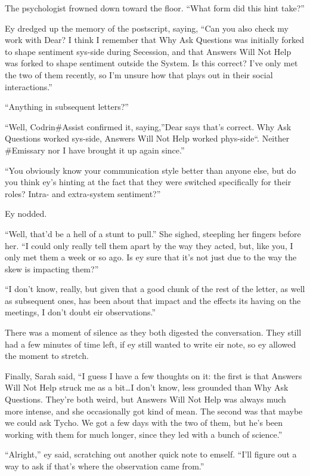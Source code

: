 The psychologist frowned down toward the floor. ``What form did this hint take?''

Ey dredged up the memory of the postscript, saying, ``Can you also check my work with Dear? I think I remember that Why Ask Questions was initially forked to shape sentiment sys-side during Secession, and that Answers Will Not Help was forked to shape sentiment outside the System. Is this correct? I've only met the two of them recently, so I'm unsure how that plays out in their social interactions.''

``Anything in subsequent letters?''

``Well, Codrin\#Assist confirmed it, saying,''Dear says that's correct. Why Ask Questions worked sys-side, Answers Will Not Help worked phys-side``. Neither \#Emissary nor I have brought it up again since.''

``You obviously know your communication style better than anyone else, but do you think ey's hinting at the fact that they were switched specifically for their roles? Intra- and extra-system sentiment?''

Ey nodded.

``Well, that'd be a hell of a stunt to pull.'' She sighed, steepling her fingers before her. ``I could only really tell them apart by the way they acted, but, like you, I only met them a week or so ago. Is ey sure that it's not just due to the way the skew is impacting them?''

``I don't know, really, but given that a good chunk of the rest of the letter, as well as subsequent ones, has been about that impact and the effects its having on the meetings, I don't doubt eir observations.''

There was a moment of silence as they both digested the conversation. They still had a few minutes of time left, if ey still wanted to write eir note, so ey allowed the moment to stretch.

Finally, Sarah said, ``I guess I have a few thoughts on it: the first is that Answers Will Not Help struck me as a bit\ldots I don't know, less grounded than Why Ask Questions. They're both weird, but Answers Will Not Help was always much more intense, and she occasionally got kind of mean. The second was that maybe we could ask Tycho. We got a few days with the two of them, but he's been working with them for much longer, since they led with a bunch of science.''

``Alright,'' ey said, scratching out another quick note to emself. ``I'll figure out a way to ask if that's where the observation came from.''

